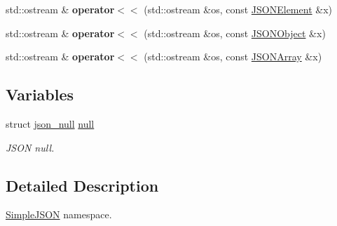 \begin{DoxyCompactItemize}
\item 
\hypertarget{namespace_simple_j_s_o_n_ae5939411a73e189c0994306995e1f3d9}{std\+::ostream \& {\bfseries operator$<$$<$} (std\+::ostream \&os, const \hyperlink{class_simple_j_s_o_n_1_1_j_s_o_n_element}{J\+S\+O\+N\+Element} \&x)}\label{namespace_simple_j_s_o_n_ae5939411a73e189c0994306995e1f3d9}

\item 
\hypertarget{namespace_simple_j_s_o_n_a138f9d9251ade45a501b0d8010afa3aa}{std\+::ostream \& {\bfseries operator$<$$<$} (std\+::ostream \&os, const \hyperlink{namespace_simple_j_s_o_n_af08971ebbb6e72577450a7b8bde7f143}{J\+S\+O\+N\+Object} \&x)}\label{namespace_simple_j_s_o_n_a138f9d9251ade45a501b0d8010afa3aa}

\item 
\hypertarget{namespace_simple_j_s_o_n_aec09469861450d21a61254c0ec660b75}{std\+::ostream \& {\bfseries operator$<$$<$} (std\+::ostream \&os, const \hyperlink{namespace_simple_j_s_o_n_ad092eb41ea5d146a50606e14e4611c6b}{J\+S\+O\+N\+Array} \&x)}\label{namespace_simple_j_s_o_n_aec09469861450d21a61254c0ec660b75}

\end{DoxyCompactItemize}
\subsection*{Variables}
\begin{DoxyCompactItemize}
\item 
\hypertarget{namespace_simple_j_s_o_n_a4831803b4944372051076380197f8a61}{struct \hyperlink{struct_simple_j_s_o_n_1_1json__null}{json\+\_\+null} \hyperlink{namespace_simple_j_s_o_n_a4831803b4944372051076380197f8a61}{null}}\label{namespace_simple_j_s_o_n_a4831803b4944372051076380197f8a61}

\begin{DoxyCompactList}\small\item\em J\+S\+O\+N null. \end{DoxyCompactList}\end{DoxyCompactItemize}


\subsection{Detailed Description}
\hyperlink{namespace_simple_j_s_o_n}{Simple\+J\+S\+O\+N} namespace. 

